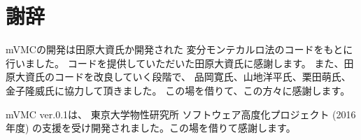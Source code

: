 \chapter{謝辞}
\label{Ch:ack}
mVMCの開発は田原大資氏か開発された
変分モンテカルロ法のコードをもとに行いました。
コードを提供していただいた田原大資氏に感謝します。
また、田原大資氏のコードを改良していく段階で、
品岡寛氏、山地洋平氏、栗田萌氏、金子隆威氏に協力して頂きました。
この場を借りて、この方々に感謝します。

mVMC ver.0.1は、
東京大学物性研究所 ソフトウェア高度化プロジェクト (2016 年度)
の支援を受け開発されました。この場を借りて感謝します。
